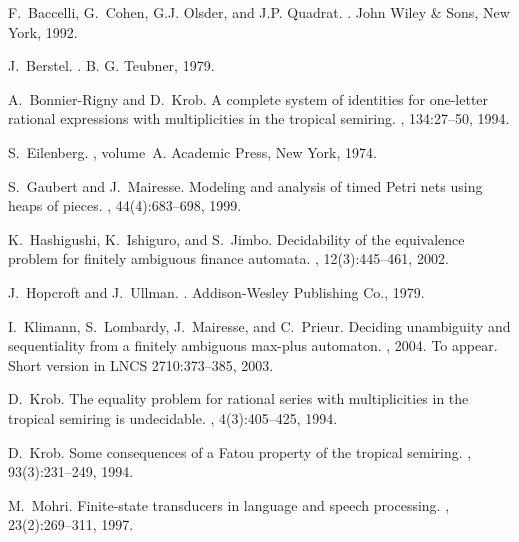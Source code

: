 \documentclass{article}
\newcommand{\1}{\mathbb{1}}
\newcommand{\0}{\mathbb{0}}
\begin{document}
\begin{thebibliography}{1}

F.~Baccelli, G.~Cohen, G.J. Olsder, and J.P. Quadrat.
.
\newblock John Wiley \& Sons, New York, 1992.

J.~Berstel.
.
\newblock B. G. Teubner, 1979.

A.~Bonnier-Rigny and D.~Krob.
\newblock A complete system of identities for one-letter rational expressions
  with multiplicities in the tropical semiring.
, 134:27--50, 1994.



S.~Eilenberg.
, volume~A.
\newblock Academic Press, New York, 1974.



S.~Gaubert and J.~Mairesse.
\newblock Modeling and analysis of timed {P}etri nets using heaps of pieces.
, 44(4):683--698, 1999.

K.~Hashigushi, K.~Ishiguro, and S.~Jimbo.
\newblock Decidability of the equivalence problem for finitely ambiguous
  finance automata.
, 12(3):445--461, 2002.

J.~Hopcroft and J.~Ullman.
.
\newblock Addison-Wesley Publishing Co., 1979.

I.~Klimann, S.~Lombardy, J.~Mairesse, and C.~Prieur.
\newblock Deciding unambiguity and sequentiality from a finitely ambiguous
  max-plus automaton.
, 2004.
\newblock To appear. Short version in LNCS 2710:373--385, 2003.

D.~Krob.
\newblock The equality problem for rational series with multiplicities in the
  tropical semiring is undecidable.
, 4(3):405--425, 1994.

D.~Krob.
\newblock Some consequences of a {F}atou property of the tropical semiring.
, 93(3):231--249, 1994.

M.~Mohri.
\newblock Finite-state transducers in language and speech processing.
, 23(2):269--311, 1997.


\end{thebibliography}
\end{document}
